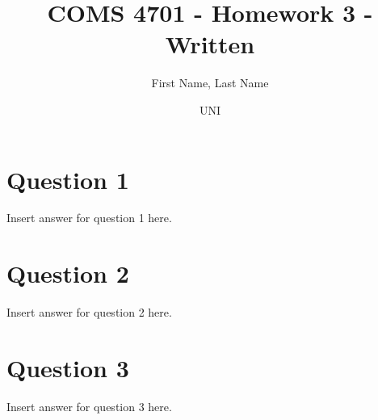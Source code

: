 \documentclass{article}
\title{COMS 4701 - Homework 3 - Written}
\author
{
First Name, Last Name
\and UNI
}
\begin{document}
    \maketitle

    \section*{Question 1}
    Insert answer for question 1 here.
    \newpage
    \section*{Question 2}
    Insert answer for question 2 here.
    \newpage
    \section*{Question 3}
    Insert answer for question 3 here.
\end{document}
